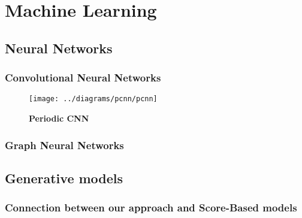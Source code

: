 
\chapter{Machine Learning}
\label{chapter4}

\ifpdf
\graphicspath{{Chapter4/Figs/Raster/}{Chapter4/Figs/PDF/}{Chapter4/Figs/}}
\else
\graphicspath{{Chapter4/Figs/Vector/}{Chapter4/Figs/}}
\fi

\section{Neural Networks}

\subsection{Convolutional Neural Networks}
\label{subsec:nn-cnn}

\begin{figure}
	\centering
	\texttt{[image: ../diagrams/pcnn/pcnn]}
	\caption[Periodic CNN]{\textbf{Periodic CNN}}
	\label{fig:pcnn}
\end{figure}


\subsection{Graph Neural Networks}
\label{subsec:nn-gnn}

\section{Generative models}
\subsection{Connection between our approach and Score-Based models}